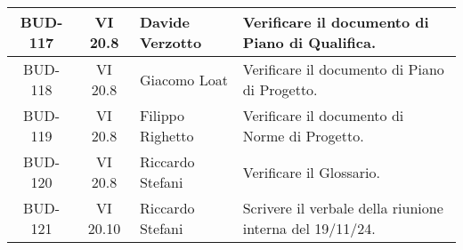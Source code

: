 \begin{table}[htbp]
\begin{tabular}{|c|c|p{}|p{}|}
    \hline
    BUD-117 & VI 20.8 & Davide Verzotto & Verificare il documento di Piano di Qualifica. \\
    \hline
    BUD-118 & VI 20.8 & Giacomo Loat & Verificare il documento di Piano di Progetto. \\
    \hline
    BUD-119 & VI 20.8 & Filippo Righetto & Verificare il documento di Norme di Progetto. \\
    \hline
    BUD-120 & VI 20.8 & Riccardo Stefani & Verificare il Glossario. \\
    \hline
    BUD-121 & VI 20.10 & Riccardo Stefani & Scrivere il verbale della riunione interna del 19/11/24. \\
    \hline
\end{tabular}
\end{table}